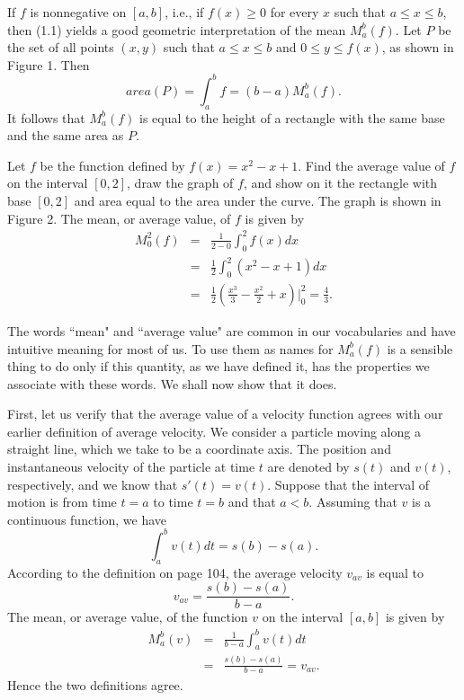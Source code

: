 If $f$ is nonnegative on $[a, b]$, i.e., if $f(x) \geq 0$ for every $x$ such that $a \leq x \leq b$, then (1.1) yields a good geometric interpretation of the mean $M_a^b(f)$. Let $P$ be the set of all points $(x,y)$ such that $a \leq x \leq b$ and $0 \leq y \leq f(x)$, as shown in Figure 1. Then
$$
area(P) = \int_a^b f = (b - a)M_a^b(f).
$$
\noindent It follows that $M_a^b(f)$ is equal to the height of a rectangle with the same base and the same area as $P$.
\begin{example} Let $f$ be the function defined by $f(x) = x^2 - x + 1$. Find the average value of $f$ on the interval $[0, 2]$, draw the graph of $f$, and show on it the rectangle with base $[0, 2]$ and area equal to the area under the curve. The graph is shown in Figure 2. The mean, or average value, of $f$ is given by
\begin{eqnarray*}
M_0^2( f ) &=& \frac{1}{2 - 0} \int_0^2 f (x) dx\\
&=& \frac{1}{2} \int_0^2 (x^2 - x + 1)dx \\
&=& \frac{1}{2}(\frac{x^3}{3} - \frac{x^2}{2} + x) \big|_0^2 = \frac{4}{3} .
\end{eqnarray*}



The words ``mean" and ``average value" are common in our vocabularies and have intuitive meaning for most of us. To use them as names for $M_a^b(f)$ is a sensible thing to do only if this quantity, as we have defined it, has the properties we associate with these words. We shall now show that it does.

First, let us verify that the average value of a velocity function agrees with our earlier definition of average velocity. We consider a particle moving along a straight line, which we take to be a coordinate axis. The position and instantaneous velocity of the particle at time $t$ are denoted by $s(t)$ and $v(t)$, respectively, and we know that $s'(t) = v(t)$. Suppose that the interval of motion is from time $t = a$ to time $t = b$ and that $a < b$. Assuming that $v$ is a continuous function, we have
$$
\int_a^b v(t) dt = s(b) - s(a).
$$
\noindent According to the definition on page 104, the average velocity $v_{av}$ is equal to 
$$
v_{av} = \frac{s(b) - s(a)}{b - a} .   
$$
\noindent The mean, or average value, of the function $v$ on the interval $[a, b]$ is given by 
\begin{eqnarray*}
M_a^b(v) &=& \frac{1}{b-a} \int_a^b v(t) dt\\
                &=& \frac{s(b) - s(a)}{b-a} = v_{av}.
\end{eqnarray*}
\noindent Hence the two definitions agree.


\end{example}
